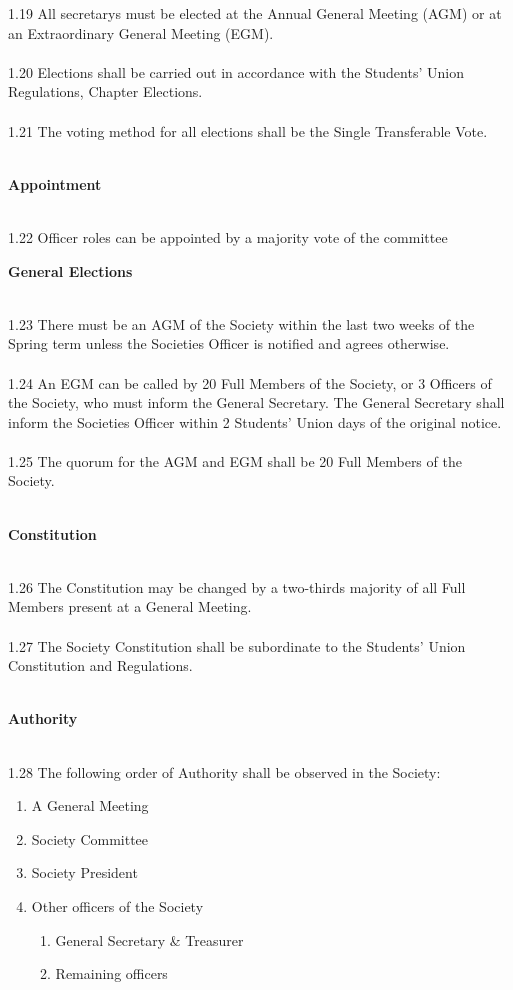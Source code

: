 \documentclass[a4paper,twoside,notitlepage,11pt]{article}
\newcommand{\consHead}[1]{\begin{Large}\textbf{#1}\end{Large}\ \\}
\begin{document}
1.19 All secretarys must be elected at the Annual General Meeting (AGM) or at an Extraordinary General Meeting (EGM).\ \\
\ \\
1.20 Elections shall be carried out in accordance with the Students' Union Regulations, Chapter Elections.\ \\
\ \\
1.21 The voting method for all elections shall be the Single Transferable Vote.\ \\
\ \\
\consHead{Appointment}
1.22 Officer roles can be appointed by a majority vote of the committee
\ \\
\consHead{General Elections}
1.23 There must be an AGM of the Society within the last two weeks of the Spring term unless the Societies Officer is notified and agrees otherwise.\ \\
\ \\
1.24 An EGM can be called by 20 Full Members of the Society, or 3 Officers of the Society, who must inform the General Secretary. The General Secretary shall inform the Societies Officer within 2 Students' Union days of the original notice.\ \\
\ \\
1.25 The quorum for the AGM and EGM shall be 20 Full Members of the Society. 
\ \\
\ \\
\consHead{Constitution}
1.26	The Constitution may be changed by a two-thirds majority of all Full Members present at a General Meeting.\ \\
\ \\
1.27 The Society Constitution shall be subordinate to the Students' Union Constitution and Regulations.
\ \\
\ \\
\consHead{Authority}
1.28 The following order of Authority shall be observed in the Society:
\begin{enumerate}
	\item A General Meeting
	\item Society Committee
	\item Society President
	\item Other officers of the Society
	\begin{enumerate}
		\item General Secretary \& Treasurer
		\item Remaining officers
	\end{enumerate}
\end{enumerate}
\end{document}
